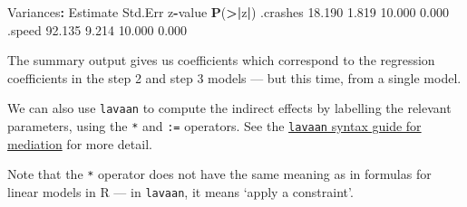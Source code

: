 \documentclass[]{article}
\newenvironment{Shaded}{\begin{snugshade}}{\end{snugshade}}
\newcommand{\ErrorTok}[1]{\textcolor[rgb]{0.64,0.00,0.00}{\textbf{#1}}}
\newcommand{\FloatTok}[1]{\textcolor[rgb]{0.00,0.00,0.81}{#1}}
\newcommand{\KeywordTok}[1]{\textcolor[rgb]{0.13,0.29,0.53}{\textbf{#1}}}
\newcommand{\NormalTok}[1]{#1}
\newcommand{\OperatorTok}[1]{\textcolor[rgb]{0.81,0.36,0.00}{\textbf{#1}}}
\newcommand{\StringTok}[1]{\textcolor[rgb]{0.31,0.60,0.02}{#1}}
\begin{document}
\begin{Shaded}
\begin{Highlighting}[]
\NormalTok{Variances}\OperatorTok{:}
\StringTok{                   }\NormalTok{Estimate  Std.Err  z}\OperatorTok{-}\NormalTok{value  }\KeywordTok{P}\NormalTok{(}\OperatorTok{>}\ErrorTok{|}\NormalTok{z}\OperatorTok{|}\NormalTok{)}
\NormalTok{   .crashes          }\FloatTok{18.190}    \FloatTok{1.819}   \FloatTok{10.000}    \FloatTok{0.000}
\NormalTok{   .speed            }\FloatTok{92.135}    \FloatTok{9.214}   \FloatTok{10.000}    \FloatTok{0.000}
\end{Highlighting}
\end{Shaded}

The summary output gives us coefficients which correspond to the regression
coefficients in the step 2 and step 3 models --- but this time, from a single
model.

We can also use \texttt{lavaan} to compute the indirect effects by labelling the
relevant parameters, using the \texttt{*} and \texttt{:=} operators. See the
\href{http://lavaan.ugent.be/tutorial/mediation.html}{\texttt{lavaan} syntax guide for mediation}
for more detail.

Note that the \texttt{*} operator does not have the same meaning as in formulas for
linear models in R --- in \texttt{lavaan}, it means `apply a constraint'.
\end{document}
